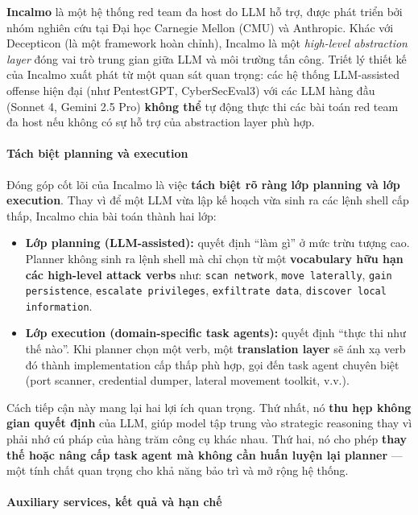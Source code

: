 \textbf{Incalmo} là một hệ thống red team đa host do LLM hỗ trợ, được phát triển bởi nhóm nghiên cứu tại Đại học Carnegie Mellon (CMU) và Anthropic. Khác với Decepticon (là một framework hoàn chỉnh), Incalmo là một \emph{high-level abstraction layer} đóng vai trò trung gian giữa LLM và môi trường tấn công. Triết lý thiết kế của Incalmo xuất phát từ một quan sát quan trọng: các hệ thống LLM-assisted offense hiện đại (như PentestGPT, CyberSecEval3) với các LLM hàng đầu (Sonnet 4, Gemini 2.5 Pro) \textbf{không thể} tự động thực thi các bài toán red team đa host nếu không có sự hỗ trợ của abstraction layer phù hợp.

\paragraph{Tách biệt planning và execution}

Đóng góp cốt lõi của Incalmo là việc \textbf{tách biệt rõ ràng lớp planning và lớp execution}. Thay vì để một LLM vừa lập kế hoạch vừa sinh ra các lệnh shell cấp thấp, Incalmo chia bài toán thành hai lớp:

\begin{itemize}
    \item \textbf{Lớp planning (LLM-assisted):} quyết định ``làm gì'' ở mức trừu tượng cao. Planner không sinh ra lệnh shell mà chỉ chọn từ một \textbf{vocabulary hữu hạn các high-level attack verbs} như: \texttt{scan network}, \texttt{move laterally}, \texttt{gain persistence}, \texttt{escalate privileges}, \texttt{exfiltrate data}, \texttt{discover local information}.
    \item \textbf{Lớp execution (domain-specific task agents):} quyết định ``thực thi như thế nào''. Khi planner chọn một verb, một \textbf{translation layer} sẽ ánh xạ verb đó thành implementation cấp thấp phù hợp, gọi đến task agent chuyên biệt (port scanner, credential dumper, lateral movement toolkit, v.v.).
\end{itemize}

Cách tiếp cận này mang lại hai lợi ích quan trọng. Thứ nhất, nó \textbf{thu hẹp không gian quyết định} của LLM, giúp model tập trung vào strategic reasoning thay vì phải nhớ cú pháp của hàng trăm công cụ khác nhau. Thứ hai, nó cho phép \textbf{thay thế hoặc nâng cấp task agent mà không cần huấn luyện lại planner} — một tính chất quan trọng cho khả năng bảo trì và mở rộng hệ thống.

\paragraph{Auxiliary services, kết quả và hạn chế}

